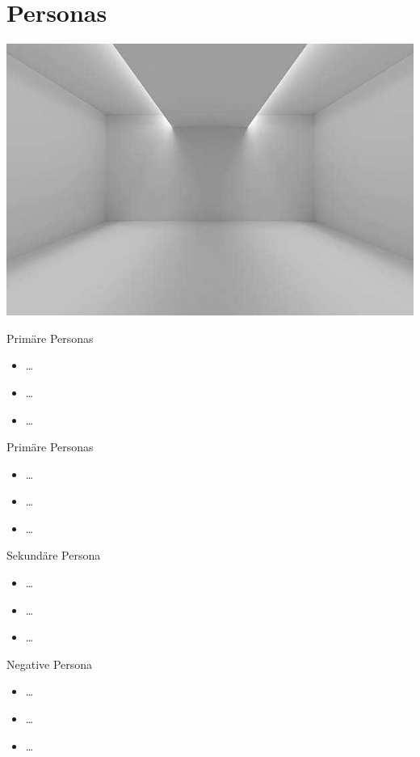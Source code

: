 \documentclass[presentation,bigger,aspectratio=169]{beamer}
\begin{document}
\section{Personas}
\label{sec:org203838a}
\begin{frame}[label={sec:org5510650}]{\MakeUppercase{\insertsection}}
\begin{center}
\begin{center}
\includegraphics[height=0.77\textheight]{./img/m1_praes_empty_01.jpg}
\label{fig:m1_praes_empty_01}
\end{center}
\end{center}
\end{frame}
\begin{frame}[label={sec:orgf2c9183}]{Primäre Personas}
\begin{itemize}
\item \ldots{}
\item \ldots{}
\item \ldots{}
\end{itemize}
\end{frame}
\begin{frame}[label={sec:org355bb5e}]{Primäre Personas}
\begin{itemize}
\item \ldots{}
\item \ldots{}
\item \ldots{}
\end{itemize}
\end{frame}
\begin{frame}[label={sec:orgc410041}]{Sekundäre Persona}
\begin{itemize}
\item \ldots{}
\item \ldots{}
\item \ldots{}
\end{itemize}
\end{frame}
\begin{frame}[label={sec:org20d9031}]{Negative Persona}
\begin{itemize}
\item \ldots{}
\item \ldots{}
\item \ldots{}
\end{itemize}
\end{frame}
\end{document}
